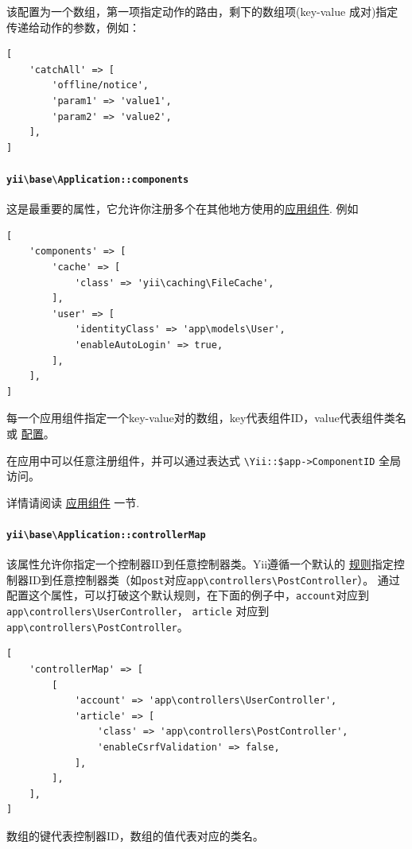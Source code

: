 该配置为一个数组，第一项指定动作的路由，剩下的数组项(key-value 成对)指定传递给动作的参数，例如：

\lstset{language=php}\begin{lstlisting}
[
    'catchAll' => [
        'offline/notice',
        'param1' => 'value1',
        'param2' => 'value2',
    ],
]
\end{lstlisting}
\paragraph{\texttt{yii{\allowbreak{}\textbackslash}base{\allowbreak{}\textbackslash}Application\allowbreak{}::\allowbreak{}components} \label{structure-applications.md::components}}
这是最重要的属性，它允许你注册多个在其他地方使用的\hyperref[structure-applications.md::::structure-application-components.md]{应用组件}. 例如

\lstset{language=php}\begin{lstlisting}
[
    'components' => [
        'cache' => [
            'class' => 'yii\caching\FileCache',
        ],
        'user' => [
            'identityClass' => 'app\models\User',
            'enableAutoLogin' => true,
        ],
    ],
]
\end{lstlisting}
每一个应用组件指定一个key-value对的数组，key代表组件ID，value代表组件类名或 \hyperref[concept-configurations.md]{配置}。

在应用中可以任意注册组件，并可以通过表达式 \lstinline|\Yii::$app->ComponentID| 全局访问。

详情请阅读 \hyperref[structure-application-components.md]{应用组件} 一节.

\paragraph{\texttt{yii{\allowbreak{}\textbackslash}base{\allowbreak{}\textbackslash}Application\allowbreak{}::\allowbreak{}controllerMap} \label{structure-applications.md::controllerMap}}
该属性允许你指定一个控制器ID到任意控制器类。Yii遵循一个默认的 \hyperref[structure-applications.md::::controllerNamespace]{规则}指定控制器ID到任意控制器类（如\lstinline|post|对应\lstinline|app\controllers\PostController|）。
通过配置这个属性，可以打破这个默认规则，在下面的例子中，\lstinline|account|对应到\lstinline|app\controllers\UserController|，
\lstinline|article| 对应到 \lstinline|app\controllers\PostController|。

\lstset{language=php}\begin{lstlisting}
[
    'controllerMap' => [
        [
            'account' => 'app\controllers\UserController',
            'article' => [
                'class' => 'app\controllers\PostController',
                'enableCsrfValidation' => false,
            ],
        ],
    ],
]
\end{lstlisting}
数组的键代表控制器ID，数组的值代表对应的类名。

